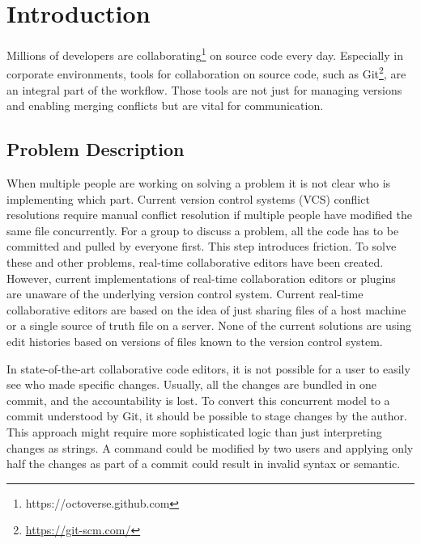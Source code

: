 \chapter{Introduction}
\label{sec:introduction}

Millions of developers are collaborating\footnote{https://octoverse.github.com} on source code every day.
Especially in corporate environments, tools for collaboration on source code, such as Git\footnote{\href{https://git-scm.com/}{https://git-scm.com/}}, are an integral part of the workflow.
Those tools are not just for managing versions and enabling merging conflicts but are vital for communication.

\section{Problem Description}

When multiple people are working on solving a problem it is not clear who is implementing which part. Current version control systems (VCS) conflict resolutions require manual conflict resolution if multiple people have modified the same file concurrently.
For a group to discuss a problem, all the code has to be committed and pulled by everyone first. This step introduces friction. To solve these and other problems, real-time collaborative editors have been created.
However, current implementations of real-time collaboration editors or plugins are unaware of the underlying version control system. Current real-time collaborative editors are based on the idea of just sharing files of a host machine or a single source of truth file on a server. None of the current solutions are using edit histories based on versions of files known to the version control system.

In state-of-the-art collaborative code editors, it is not possible for a user to easily see who made specific changes. Usually, all the changes are bundled in one commit, and the accountability is lost. To convert this concurrent model to a commit understood by Git, it should be possible to stage changes by the author. This approach might require more sophisticated logic than just interpreting changes as strings. A command could be modified by two users and applying only half the changes as part of a commit could result in invalid syntax or semantic.

